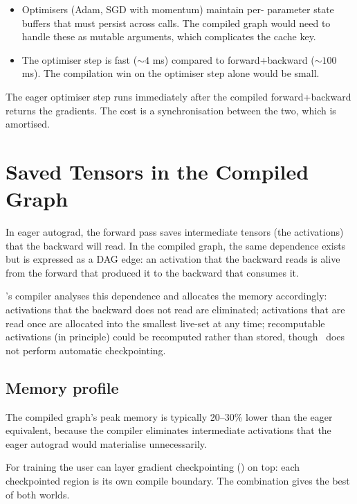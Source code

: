 \begin{itemize}
  \item Optimisers (Adam, SGD with momentum) maintain per-
    parameter state buffers that must persist across calls. The
    compiled graph would need to handle these as mutable
    arguments, which complicates the cache key.
  \item The optimiser step is fast ($\sim 4$ ms) compared to
    forward+backward ($\sim 100$ ms). The compilation win on the
    optimiser step alone would be small.
\end{itemize}

The eager optimiser step runs immediately after the compiled
forward+backward returns the gradients. The cost is a
synchronisation between the two, which is amortised.

\section{Saved Tensors in the Compiled Graph}
\label{sec:fwd_bwd_compile:saved_tensors}

In eager autograd, the forward pass saves intermediate tensors
(the activations) that the backward will read. In the compiled
graph, the same dependence exists but is expressed as a DAG
edge: an activation that the backward reads is alive from the
forward that produced it to the backward that consumes it.

\MPSGraph's compiler analyses this dependence and allocates the
memory accordingly: activations that the backward does not read
are eliminated; activations that are read once are allocated
into the smallest live-set at any time; recomputable activations
(in principle) could be recomputed rather than stored, though
\MPSGraph\ does not perform automatic checkpointing.

\subsection{Memory profile}
\label{ssec:fwd_bwd_compile:memory_profile}

The compiled graph's peak memory is typically 20--30\% lower than
the eager equivalent, because the compiler eliminates
intermediate activations that the eager autograd would
materialise unnecessarily.

For training the user can layer gradient checkpointing
() on top: each checkpointed
region is its own compile boundary. The combination gives the
best of both worlds.

